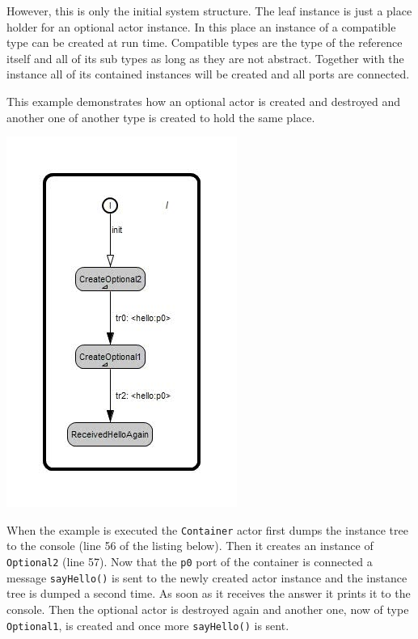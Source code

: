 However, this is only the initial system structure.
The leaf instance is just a place holder for an optional actor instance.
In this place an instance of a compatible type can be created at run time.
Compatible types are the type of the reference itself and all of its sub types as long as they are not abstract.
Together with the instance all of its contained instances will be created and all ports are connected.

This example demonstrates how an optional actor is created and destroyed and another one of another type
is created to hold the same place.

\includegraphics[scale=0.7]{images/039-DynAct1-Container_behavior.jpg}

When the example is executed the \texttt{Container} actor first dumps the instance tree to the console
(line 56 of the listing below).
Then it creates an instance of \texttt{Optional2} (line 57). Now that the \texttt{p0} port
of the container is connected a message \texttt{sayHello()} is sent to the newly created actor instance
and the instance tree is dumped a second time.
As soon as it receives the answer it prints it to the console. Then the optional actor is destroyed again
and another one, now of type \texttt{Optional1}, is created and once more \texttt{sayHello()} is sent.



